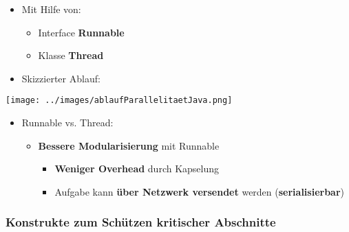 			\begin{itemize}
				\item Mit Hilfe von:
				\begin{itemize}
					\item Interface \textbf{Runnable}
					\item Klasse \textbf{Thread}
				\end{itemize}
				\newpage
				\item Skizzierter Ablauf:			
			\end{itemize}			
			\begin{center}
				\texttt{[image: ../images/ablaufParallelitaetJava.png]}
			\end{center}
						
			\begin{itemize}
				\item Runnable vs. Thread:
				\begin{itemize}
					\item \textbf{Bessere Modularisierung} mit Runnable
					\begin{itemize}
						\item \textbf{Weniger Overhead} durch Kapselung
						\item Aufgabe kann \textbf{über Netzwerk versendet} werden (\textbf{serialisierbar})
					\end{itemize}
				\end{itemize}
			\end{itemize}
			
		\subsubsection{Konstrukte zum Schützen kritischer Abschnitte}
			

